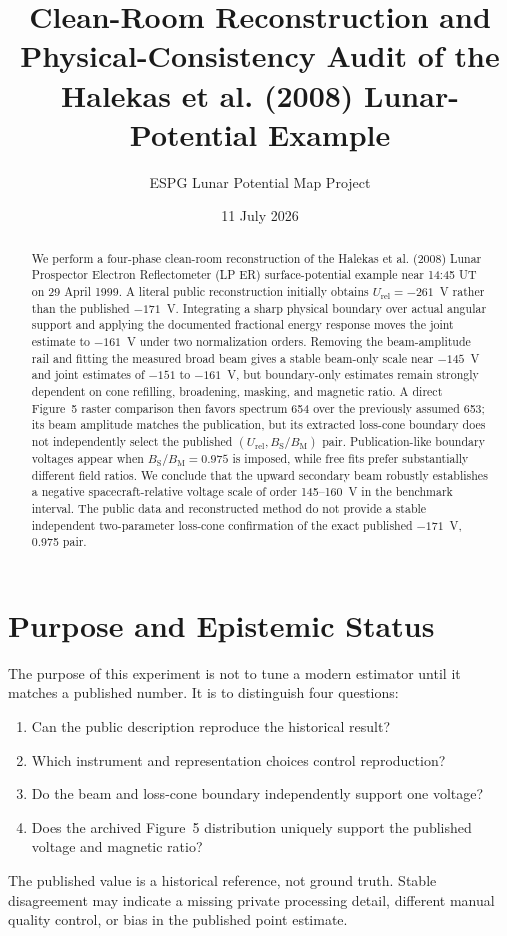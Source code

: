 \documentclass[11pt]{article}
\title{Clean-Room Reconstruction and Physical-Consistency Audit of the\\
Halekas et al. (2008) Lunar-Potential Example}
\author{ESPG Lunar Potential Map Project}
\date{11 July 2026}
\newcommand{\Urel}{U_{\mathrm{rel}}}
\newcommand{\BSBM}{B_{\mathrm{S}}/B_{\mathrm{M}}}
\begin{document}
\maketitle

\begin{abstract}
We perform a four-phase clean-room reconstruction of the Halekas et al. (2008)
Lunar Prospector Electron Reflectometer (LP ER) surface-potential example near
14:45 UT on 29 April 1999.  A literal public reconstruction initially obtains
$\Urel=-261$~V rather than the published $-171$~V.  Integrating a sharp physical
boundary over actual angular support and applying the documented fractional
energy response moves the joint estimate to $-161$~V under two normalization
orders.  Removing the beam-amplitude rail and fitting the measured broad beam
gives a stable beam-only scale near $-145$~V and joint estimates of
$-151$ to $-161$~V, but boundary-only estimates remain strongly dependent on
cone refilling, broadening, masking, and magnetic ratio.  A direct Figure~5
raster comparison then favors spectrum 654 over the previously assumed 653;
its beam amplitude matches the publication, but its extracted loss-cone
boundary does not independently select the published $(\Urel,\BSBM)$ pair.
Publication-like boundary voltages appear when $\BSBM=0.975$ is imposed, while
free fits prefer substantially different field ratios.  We conclude that the
upward secondary beam robustly establishes a negative spacecraft-relative
voltage scale of order 145--160~V in the benchmark interval.  The public data
and reconstructed method do not provide a stable independent two-parameter
loss-cone confirmation of the exact published $-171$~V, 0.975 pair.
\end{abstract}

\section{Purpose and Epistemic Status}

The purpose of this experiment is not to tune a modern estimator until it
matches a published number.  It is to distinguish four questions:
\begin{enumerate}
  \item Can the public description reproduce the historical result?
  \item Which instrument and representation choices control reproduction?
  \item Do the beam and loss-cone boundary independently support one voltage?
  \item Does the archived Figure~5 distribution uniquely support the published
        voltage and magnetic ratio?
\end{enumerate}
The published value is a historical reference, not ground truth.  Stable
disagreement may indicate a missing private processing detail, different manual
quality control, or bias in the published point estimate.
\end{document}
